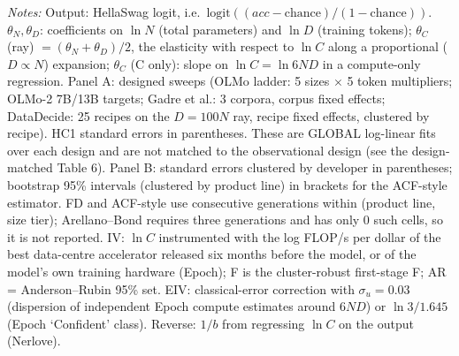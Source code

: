 \begin{table}[!htbp]
\begin{threeparttable}
\begin{tablenotes}[flushleft]
\item \textit{Notes:} Output: HellaSwag logit, i.e.\ $\text{logit}((acc-\text{chance})/(1-\text{chance}))$. $\theta_N,\theta_D$: coefficients on $\ln N$ (total parameters) and $\ln D$ (training tokens); $\theta_C$ (ray) $=(\theta_N+\theta_D)/2$, the elasticity with respect to $\ln C$ along a proportional ($D\propto N$) expansion; $\theta_C$ (C only): slope on $\ln C=\ln 6ND$ in a compute-only regression. Panel A: designed sweeps (OLMo ladder: 5 sizes $\times$ 5 token multipliers; OLMo-2 7B/13B targets; Gadre et al.: 3 corpora, corpus fixed effects; DataDecide: 25 recipes on the $D=100N$ ray, recipe fixed effects, clustered by recipe). HC1 standard errors in parentheses. These are GLOBAL log-linear fits over each design and are not matched to the observational design (see the design-matched Table 6). Panel B: standard errors clustered by developer in parentheses; bootstrap 95\% intervals (clustered by product line) in brackets for the ACF-style estimator. FD and ACF-style use consecutive generations within (product line, size tier); Arellano--Bond requires three generations and has only 0 such cells, so it is not reported. IV: $\ln C$ instrumented with the log FLOP/s per dollar of the best data-centre accelerator released six months before the model, or of the model's own training hardware (Epoch); F is the cluster-robust first-stage F; AR = Anderson--Rubin 95\% set. EIV: classical-error correction with $\sigma_u=0.03$ (dispersion of independent Epoch compute estimates around $6ND$) or $\ln 3/1.645$ (Epoch `Confident' class). Reverse: $1/b$ from regressing $\ln C$ on the output (Nerlove).
\end{tablenotes}
\end{threeparttable}
\end{table}
